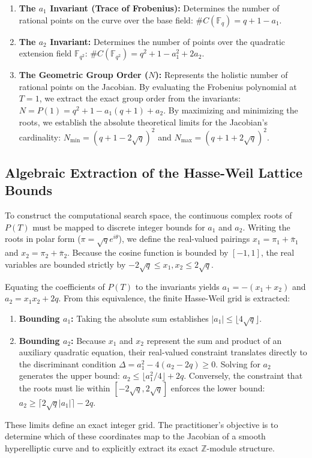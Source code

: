 \documentclass[11pt,letterpaper]{article}
\begin{document}
\begin{enumerate}
\item \textbf{The $a_1$ Invariant (Trace of Frobenius):} Determines the number of rational points on the curve over the base field: $\#C(\mathbb{F}_q) = q + 1 - a_1$.
\item \textbf{The $a_2$ Invariant:} Determines the number of points over the quadratic extension field $\mathbb{F}_{q^2}$: $\#C(\mathbb{F}_{q^2}) = q^2 + 1 - a_1^2 + 2a_2$.
\item \textbf{The Geometric Group Order ($N$):} Represents the holistic number of rational points on the Jacobian. By evaluating the Frobenius polynomial at $T=1$, we extract the exact group order from the invariants: $N = P(1) = q^2 + 1 - a_1(q + 1) + a_2$. By maximizing and minimizing the roots, we establish the absolute theoretical limits for the Jacobian's cardinality: $N_{\text{min}} = (q + 1 - 2\sqrt{q})^2$ and $N_{\text{max}} = (q + 1 + 2\sqrt{q})^2$.
\end{enumerate}

\subsection{Algebraic Extraction of the Hasse-Weil Lattice Bounds}
To construct the computational search space, the continuous complex roots of $P(T)$ must be mapped to discrete integer bounds for $a_1$ and $a_2$. Writing the roots in polar form ($\pi = \sqrt{q}e^{i\theta}$), we define the real-valued pairings $x_1 = \pi_1 + \bar{\pi}_1$ and $x_2 = \pi_2 + \bar{\pi}_2$. Because the cosine function is bounded by $[-1, 1]$, the real variables are bounded strictly by $-2\sqrt{q} \le x_1, x_2 \le 2\sqrt{q}$. 

Equating the coefficients of $P(T)$ to the invariants yields $a_1 = -(x_1 + x_2)$ and $a_2 = x_1 x_2 + 2q$. From this equivalence, the finite Hasse-Weil grid is extracted:
\begin{enumerate}
\item \textbf{Bounding $a_1$:} Taking the absolute sum establishes $|a_1| \le \lfloor 4\sqrt{q} \rfloor$.
\item \textbf{Bounding $a_2$:} Because $x_1$ and $x_2$ represent the sum and product of an auxiliary quadratic equation, their real-valued constraint translates directly to the discriminant condition $\Delta = a_1^2 - 4(a_2 - 2q) \ge 0$. Solving for $a_2$ generates the upper bound: $a_2 \le \lfloor a_1^2/4 \rfloor + 2q$. Conversely, the constraint that the roots must lie within $[-2\sqrt{q}, 2\sqrt{q}]$ enforces the lower bound: $a_2 \ge \lceil 2\sqrt{q}|a_1| \rceil - 2q$.
\end{enumerate}
These limits define an exact integer grid. The practitioner's objective is to determine which of these coordinates map to the Jacobian of a smooth hyperelliptic curve and to explicitly extract its exact $\mathbb{Z}$-module structure.
\end{document}
